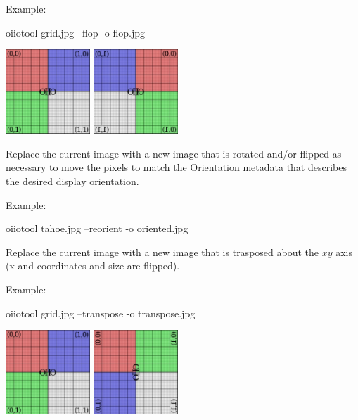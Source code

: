 \noindent Example:
\begin{code}
    oiiotool grid.jpg --flop -o flop.jpg
\end{code}
\spc \includegraphics[width=1.25in]{figures/grid-small.jpg} 
\raisebox{40pt}{\large $\rightarrow$}
\includegraphics[width=1.25in]{figures/flop.jpg} \\
\apiend

Replace the current image with a new image that is rotated and/or flipped
as necessary to move the pixels to match the Orientation metadata
that describes the desired display orientation.

\noindent Example:
\begin{code}
    oiiotool tahoe.jpg --reorient -o oriented.jpg
\end{code}
\apiend

Replace the current image with a new image that is trasposed about
the $xy$ axis (x and coordinates and size are flipped).

\noindent Example:
\begin{code}
    oiiotool grid.jpg --transpose -o transpose.jpg
\end{code}
\spc \includegraphics[width=1.25in]{figures/grid-small.jpg} 
\raisebox{40pt}{\large $\rightarrow$}
\includegraphics[width=1.25in]{figures/transpose.jpg} \\
\apiend

